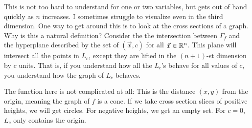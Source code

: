 This is not too hard to understand for one or two variables, but gets out of hand quickly as $n$ increases. I sometimes struggle to visualize even in the third dimension. One way to get around this is to look at the cross sections of a graph. 
Why is this a natural definition? Consider the the intersection between $\Gamma_f$ and the hyperplane described by the set of $(\vec{x},c)$ for all $\vec{x}\in \mathbb{R}^n$. This plane will intersect all the points in $L_c$, except they are lifted in the $(n+1)$-st dimension by $c$ units. That is, if you understand how all the $L_c$'s behave for all values of $c$, you understand how the graph of $L_c$ behaves.

The function here is not complicated at all: This is the distance $(x,y)$ from the origin, meaning the graph of $f$ is a cone. If we take cross section slices of positive heights, we will get circles. For negative heights, we get an empty set. For $c=0$, $L_c$ only contains the origin.

